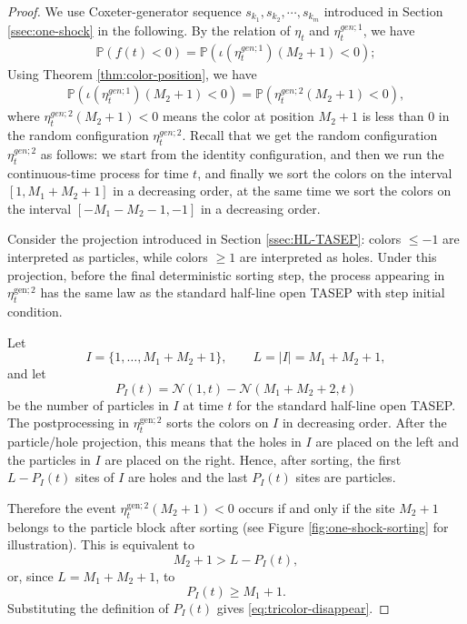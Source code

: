\documentclass[12pt,a4paper]{amsart}
\theoremstyle{remark}
\numberwithin{equation}{section} \numberwithin{theorem}{section}
\begin{document}
\begin{proof}
We use Coxeter-generator sequence $s_{k_1}, s_{k_2}, \cdots,s_{k_m}$ introduced in Section \ref{ssec:one-shock} in the following. By the relation of $\eta_t$ and $\eta_{t}^{gen;1}$, we have
\begin{align*}
\mathbb{P}(f(t)<0)=\mathbb{P}(\iota( \eta_{t}^{gen;1})(M_2+1)<0);
\end{align*}
Using Theorem \ref{thm:color-position}, we have
\begin{align*}
\mathbb{P}(\iota( \eta_{t}^{gen;1})(M_2+1)<0)=\mathbb{P}(\eta_{t}^{gen;2}(M_2+1)<0),
\end{align*}
where $\eta_{t}^{gen;2}(M_2+1)<0$ means the color at position $M_2+1$ is less than $0$ in the random configuration $\eta_{t}^{gen;2}$. Recall that we get the random configuration $\eta_{t}^{gen;2}$ as follows: we start from the identity configuration, and then we run the continuous-time process for time $t$, and finally we sort the colors on the interval $[1,M_1+M_2+1]$ in a decreasing order, at the same time we sort the colors on the interval $[-M_1-M_2-1,-1]$ in a decreasing order.

Consider the projection introduced in Section \ref{ssec:HL-TASEP}: colors $\leq -1$ are interpreted as particles, while colors $\geq 1$ are interpreted as holes. 
Under this projection, before the final deterministic sorting step, the process appearing in $\eta_t^{\mathrm{gen};2}$ has the same law as the standard half-line open TASEP with step initial condition.

Let
\[
I=\{1,\ldots,M_1+M_2+1\}, \qquad L=|I|=M_1+M_2+1,
\]
and let
\[
P_I(t)=\mathcal N(1,t)-\mathcal N(M_1+M_2+2,t)
\]
be the number of particles in $I$ at time $t$ for the standard half-line open TASEP. 
The postprocessing in $\eta_t^{\mathrm{gen};2}$ sorts the colors on $I$ in decreasing order. 
After the particle/hole projection, this means that the holes in $I$ are placed on the left and the particles in $I$ are placed on the right. 
Hence, after sorting, the first $L-P_I(t)$ sites of $I$ are holes and the last $P_I(t)$ sites are particles.

Therefore the event $\eta_t^{\mathrm{gen};2}(M_2+1)<0$ occurs if and only if the site $M_2+1$ belongs to the particle block after sorting (see Figure \ref{fig:one-shock-sorting} for illustration). 
This is equivalent to
\[
M_2+1>L-P_I(t),
\]
or, since $L=M_1+M_2+1$, to
\[
P_I(t)\geq M_1+1.
\]
Substituting the definition of $P_I(t)$ gives \eqref{eq:tricolor-disappear}.
\end{proof}
\end{document}
